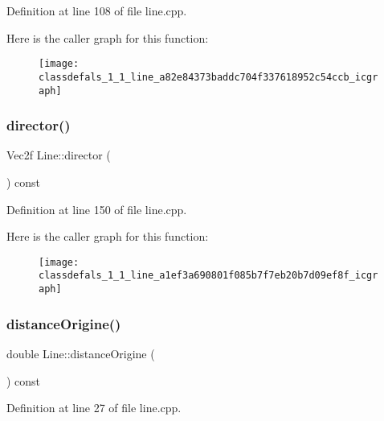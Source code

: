 Definition at line 108 of file line.\+cpp.

Here is the caller graph for this function\+:\nopagebreak
\begin{figure}[H]
\begin{center}
\leavevmode
\texttt{[image: classdefals\_1\_1\_line\_a82e84373baddc704f337618952c54ccb\_icgraph]}
\end{center}
\end{figure}
\mbox{\label{classdefals_1_1_line_a1ef3a690801f085b7f7eb20b7d09ef8f}} 
\subsubsection{\texorpdfstring{director()}{director()}}
{\footnotesize\ttfamily Vec2f Line\+::director (\begin{DoxyParamCaption}{ }\end{DoxyParamCaption}) const}



Definition at line 150 of file line.\+cpp.

Here is the caller graph for this function\+:\nopagebreak
\begin{figure}[H]
\begin{center}
\leavevmode
\texttt{[image: classdefals\_1\_1\_line\_a1ef3a690801f085b7f7eb20b7d09ef8f\_icgraph]}
\end{center}
\end{figure}
\mbox{\label{classdefals_1_1_line_a0fec2160803d603b3f341814ccf67499}} 
\subsubsection{\texorpdfstring{distance\+Origine()}{distanceOrigine()}}
{\footnotesize\ttfamily double Line\+::distance\+Origine (\begin{DoxyParamCaption}{ }\end{DoxyParamCaption}) const}



Definition at line 27 of file line.\+cpp.

\mbox{\label{classdefals_1_1_line_aff1b80e77814f9136512023fdfedaf85}} 
